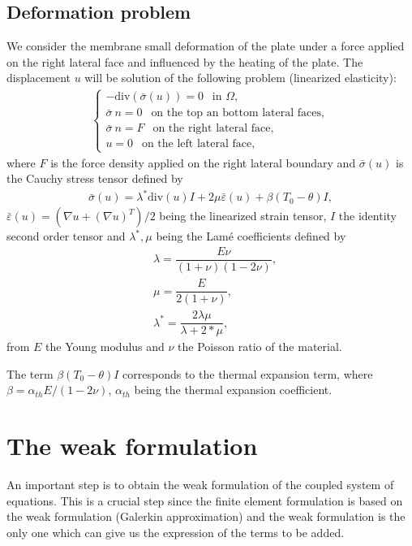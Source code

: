 \documentclass[a4paper,11pt,english]{sphinxmanual}
\begin{document}
\subsection{Deformation problem}
\label{\detokenize{tutorial/thermo_coupling:deformation-problem}}
We consider the membrane small deformation of the plate under a force applied on the right lateral face and influenced by the heating of the plate. The displacement \(u\) will be solution of the following problem (linearized elasticity):
\begin{equation*}
\begin{split} \left\{\begin{array}{l}
-\mbox{div}(\bar{\sigma}(u)) = 0 ~~ \mbox{ in } \Omega, \\
\bar{\sigma}\ n = 0 ~~ \mbox{ on the top an bottom lateral faces}, \\
\bar{\sigma}\ n = F ~~ \mbox{ on the right lateral face}, \\
u = 0 ~~ \mbox{ on the left lateral face},
\end{array} \right.\end{split}
\end{equation*}
where \(F\) is the force density applied on the right lateral boundary and \(\bar{\sigma}(u)\) is the Cauchy stress tensor defined by
\begin{equation*}
\begin{split}\bar{\sigma}(u) = \lambda^* \mbox{div}(u) I + 2\mu \bar{\varepsilon}(u) + \beta(T_0-\theta) I,\end{split}
\end{equation*}
\(\bar{\varepsilon}(u) = (\nabla u + (\nabla u)^T)/2\) being the linearized strain tensor, \(I\) the identity second order tensor and \(\lambda^*, \mu\) being the Lamé coefficients defined  by
\begin{equation*}
\begin{split}&\lambda = \dfrac{E\nu}{(1+\nu)(1-2\nu)}, \\
&\mu = \dfrac{E}{2(1+\nu)}, \\
&\lambda^* = \dfrac{2\lambda\mu}{\lambda+2*\mu},\end{split}
\end{equation*}
from \(E\) the Young modulus and \(\nu\) the Poisson ratio of the material.

The term \(\beta(T_0-\theta) I\) corresponds to the thermal expansion term, where \(\beta = \alpha_{th} E/(1-2\nu)\), \(\alpha_{th}\) being the thermal expansion coefficient.


\section{The weak formulation}
\label{\detokenize{tutorial/thermo_coupling:the-weak-formulation}}
An important step is to obtain the weak formulation of the coupled system of equations. This is a crucial step since the finite element formulation is based on the weak formulation (Galerkin approximation) and the weak formulation is the only one which can give us the expression of the terms to be added.
\end{document}
